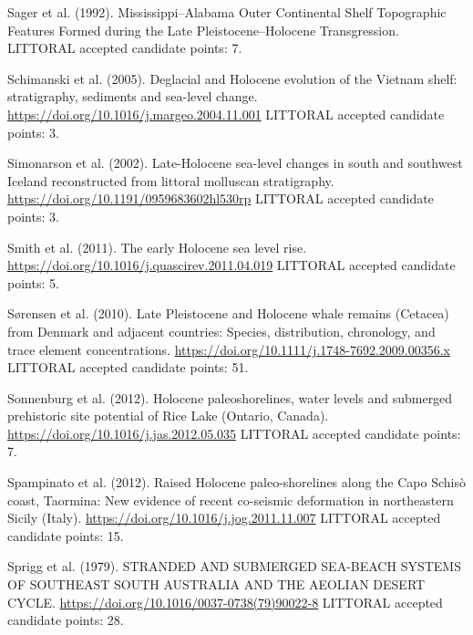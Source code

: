 \documentclass[twocolumn,10pt]{article}
\begin{document}
\begin{thebibliography}{}
Sager et al. (1992).
\newblock Mississippi–Alabama Outer Continental Shelf Topographic Features Formed during the Late Pleistocene–Holocene Transgression.
\newblock LITTORAL accepted candidate points: 7.

Schimanski et al. (2005).
\newblock Deglacial and Holocene evolution of the Vietnam shelf: stratigraphy, sediments and sea-level change.
\newblock \url{https://doi.org/10.1016/j.margeo.2004.11.001}
\newblock LITTORAL accepted candidate points: 3.

Simonarson et al. (2002).
\newblock Late-Holocene sea-level changes in south and southwest Iceland reconstructed from littoral molluscan stratigraphy.
\newblock \url{https://doi.org/10.1191/0959683602hl530rp}
\newblock LITTORAL accepted candidate points: 3.

Smith et al. (2011).
\newblock The early Holocene sea level rise.
\newblock \url{https://doi.org/10.1016/j.quascirev.2011.04.019}
\newblock LITTORAL accepted candidate points: 5.

Sørensen et al. (2010).
\newblock Late Pleistocene and Holocene whale remains (Cetacea) from Denmark and adjacent countries: Species, distribution, chronology, and trace element concentrations.
\newblock \url{https://doi.org/10.1111/j.1748-7692.2009.00356.x}
\newblock LITTORAL accepted candidate points: 51.

Sonnenburg et al. (2012).
\newblock Holocene paleoshorelines, water levels and submerged prehistoric site potential of Rice Lake (Ontario, Canada).
\newblock \url{https://doi.org/10.1016/j.jas.2012.05.035}
\newblock LITTORAL accepted candidate points: 7.

Spampinato et al. (2012).
\newblock Raised Holocene paleo-shorelines along the Capo Schisò coast, Taormina: New evidence of recent co-seismic deformation in northeastern Sicily (Italy).
\newblock \url{https://doi.org/10.1016/j.jog.2011.11.007}
\newblock LITTORAL accepted candidate points: 15.

Sprigg et al. (1979).
\newblock STRANDED AND SUBMERGED SEA-BEACH SYSTEMS OF SOUTHEAST SOUTH AUSTRALIA AND THE AEOLIAN DESERT CYCLE.
\newblock \url{https://doi.org/10.1016/0037-0738(79)90022-8}
\newblock LITTORAL accepted candidate points: 28.


\end{thebibliography}
\end{document}
